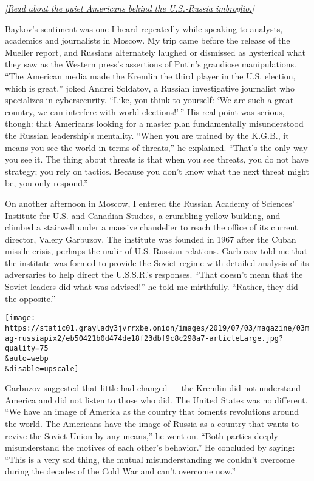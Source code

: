 \href{https://www.nytimes3xbfgragh.onion/2018/05/08/magazine/the-quiet-americans-behind-the-us-russia-imbroglio.html}{\emph{{[}Read
about the quiet Americans behind the U.S.-Russia imbroglio.{]}}}

Baykov's sentiment was one I heard repeatedly while speaking to
analysts, academics and journalists in Moscow. My trip came before the
release of the Mueller report, and Russians alternately laughed or
dismissed as hysterical what they saw as the Western press's assertions
of Putin's grandiose manipulations. ``The American media made the
Kremlin the third player in the U.S. election, which is great,'' joked
Andrei Soldatov, a Russian investigative journalist who specializes in
cybersecurity. ``Like, you think to yourself: `We are such a great
country, we can interfere with world elections!' '' His real point was
serious, though: that Americans looking for a master plan fundamentally
misunderstood the Russian leadership's mentality. ``When you are trained
by the K.G.B., it means you see the world in terms of threats,'' he
explained. ``That's the only way you see it. The thing about threats is
that when you see threats, you do not have strategy; you rely on
tactics. Because you don't know what the next threat might be, you only
respond.''

On another afternoon in Moscow, I entered the Russian Academy of
Sciences' Institute for U.S. and Canadian Studies, a crumbling yellow
building, and climbed a stairwell under a massive chandelier to reach
the office of its current director, Valery Garbuzov. The institute was
founded in 1967 after the Cuban missile crisis, perhaps the nadir of
U.S.-Russian relations. Garbuzov told me that the institute was formed
to provide the Soviet regime with detailed analysis of its adversaries
to help direct the U.S.S.R.'s responses. ``That doesn't mean that the
Soviet leaders did what was advised!'' he told me mirthfully. ``Rather,
they did the opposite.''

\texttt{[image: https://static01.graylady3jvrrxbe.onion/images/2019/07/03/magazine/03mag-russiapix2/eb50421b0d474de18f23dbf9c8c298a7-articleLarge.jpg?quality=75\\\&auto=webp\\\&disable=upscale]}

Garbuzov suggested that little had changed --- the Kremlin did not
understand America and did not listen to those who did. The United
States was no different. ``We have an image of America as the country
that foments revolutions around the world. The Americans have the image
of Russia as a country that wants to revive the Soviet Union by any
means,'' he went on. ``Both parties deeply misunderstand the motives of
each other's behavior.'' He concluded by saying: ``This is a very sad
thing, the mutual misunderstanding we couldn't overcome during the
decades of the Cold War and can't overcome now.''

